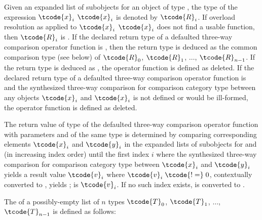 \pnum
Given an expanded list of subobjects for an object  of type ,
the type of the expression $\tcode{x}_i$ \tcode{<=>} $\tcode{x}_i$
is denoted by $\tcode{R}_i$.
If overload resolution as applied to $\tcode{x}_i$ \tcode{<=>} $\tcode{x}_i$
does not find a usable function,
then $\tcode{R}_i$ is .
If the declared return type
of a defaulted three-way comparison operator function
is ,
then the return type is deduced as
the common comparison type (see below) of
$\tcode{R}_0$, $\tcode{R}_1$, $\dotsc$, $\tcode{R}_{n-1}$.
If the return type is deduced as ,
the operator function is defined as deleted.
If the declared return type of
a defaulted three-way comparison operator function
is 
and the synthesized three-way comparison
for comparison category type 
between any objects $\tcode{x}_i$ and $\tcode{x}_i$
is not defined or would be ill-formed,
the operator function is defined as deleted.

\pnum
The return value  of type 
of the defaulted three-way comparison operator function
with parameters  and  of the same type
is determined by comparing corresponding elements
$\tcode{x}_i$ and $\tcode{y}_i$
in the expanded lists of subobjects for  and 
(in increasing index order)
until the first index $i$ where
the synthesized three-way comparison for comparison category type 
between $\tcode{x}_i$ and $\tcode{y}_i$
yields a result value $\tcode{v}_i$ where $\tcode{v}_i \mathrel{\tcode{!=}} 0$,
contextually converted to , yields ;
 is $\tcode{v}_i$.
If no such index exists,  is
 converted to .

\pnum
The  
of a possibly-empty list of $n$ types
$\tcode{T}_0$, $\tcode{T}_1$, $\dotsc$, $\tcode{T}_{n-1}$
is defined as follows:

